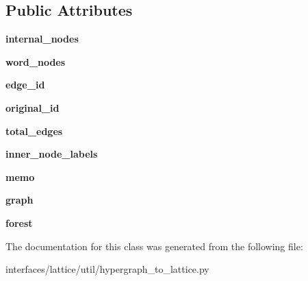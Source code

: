 \subsection*{Public Attributes}
\begin{DoxyCompactItemize}
\item 
\hypertarget{classhypergraph__to__lattice_1_1NodeExtractor_a74420da9e353412aa05c2bd17187a47f}{
{\bfseries internal\_\-nodes}}
\label{classhypergraph__to__lattice_1_1NodeExtractor_a74420da9e353412aa05c2bd17187a47f}

\item 
\hypertarget{classhypergraph__to__lattice_1_1NodeExtractor_a89b13a6e84b8e29e6783bb3bb041db90}{
{\bfseries word\_\-nodes}}
\label{classhypergraph__to__lattice_1_1NodeExtractor_a89b13a6e84b8e29e6783bb3bb041db90}

\item 
\hypertarget{classhypergraph__to__lattice_1_1NodeExtractor_a413da4c636a4ec6d55aebd8de0238a20}{
{\bfseries edge\_\-id}}
\label{classhypergraph__to__lattice_1_1NodeExtractor_a413da4c636a4ec6d55aebd8de0238a20}

\item 
\hypertarget{classhypergraph__to__lattice_1_1NodeExtractor_a3b95feeba90619e24bda406061104f29}{
{\bfseries original\_\-id}}
\label{classhypergraph__to__lattice_1_1NodeExtractor_a3b95feeba90619e24bda406061104f29}

\item 
\hypertarget{classhypergraph__to__lattice_1_1NodeExtractor_a042ce7593f25f0a52b4709ad83809b03}{
{\bfseries total\_\-edges}}
\label{classhypergraph__to__lattice_1_1NodeExtractor_a042ce7593f25f0a52b4709ad83809b03}

\item 
\hypertarget{classhypergraph__to__lattice_1_1NodeExtractor_a133d3c9156158f1acad9f62fb821fc9e}{
{\bfseries inner\_\-node\_\-labels}}
\label{classhypergraph__to__lattice_1_1NodeExtractor_a133d3c9156158f1acad9f62fb821fc9e}

\item 
\hypertarget{classhypergraph__to__lattice_1_1NodeExtractor_a164192af340a81cd82e88450996f0385}{
{\bfseries memo}}
\label{classhypergraph__to__lattice_1_1NodeExtractor_a164192af340a81cd82e88450996f0385}

\item 
\hypertarget{classhypergraph__to__lattice_1_1NodeExtractor_af647d8edf905a6ee59b844b8d18a1a3d}{
{\bfseries graph}}
\label{classhypergraph__to__lattice_1_1NodeExtractor_af647d8edf905a6ee59b844b8d18a1a3d}

\item 
\hypertarget{classhypergraph__to__lattice_1_1NodeExtractor_a89d8e66a6557714e84b16065c8d78b11}{
{\bfseries forest}}
\label{classhypergraph__to__lattice_1_1NodeExtractor_a89d8e66a6557714e84b16065c8d78b11}

\end{DoxyCompactItemize}


The documentation for this class was generated from the following file:\begin{DoxyCompactItemize}
\item 
interfaces/lattice/util/hypergraph\_\-to\_\-lattice.py\end{DoxyCompactItemize}

